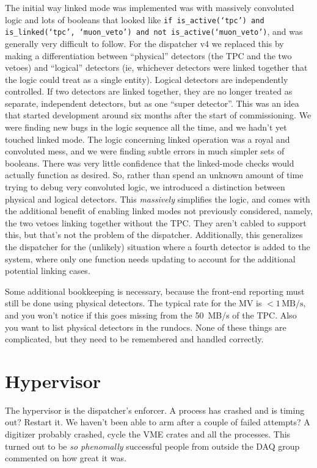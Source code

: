 The initial way linked mode was implemented was with massively convoluted logic and lots of booleans that looked like \texttt{if is\_active(`tpc') and is\_linked(`tpc', `muon\_veto') and not is\_active(`muon\_veto')}, and was generally very difficult to follow.
For the dispatcher v4 we replaced this by making a differentiation between ``physical'' detectors (the TPC and the two vetoes) and ``logical'' detectors (ie, whichever detectors were linked together that the logic could treat as a single entity).
Logical detectors are independently controlled.
If two detectors are linked together, they are no longer treated as separate, independent detectors, but as one ``super detector''.
This was an idea that started development around six months after the start of commissioning.
We were finding new bugs in the logic sequence all the time, and we hadn't yet touched linked mode.
The logic concerning linked operation was a royal and convoluted mess, and we were finding subtle errors in much simpler sets of booleans.
There was very little confidence that the linked-mode checks would actually function as desired.
So, rather than spend an unknown amount of time trying to debug very convoluted logic, we introduced a distinction between physical and logical detectors.
This \emph{massively} simplifies the logic, and comes with the additional benefit of enabling linked modes not previously considered, namely, the two vetoes linking together without the TPC.
They aren't cabled to support this, but that's not the problem of the dispatcher.
Additionally, this generalizes the dispatcher for the (unlikely) situation where a fourth detector is added to the system, where only one function needs updating to account for the additional potential linking cases.

Some additional bookkeeping is necessary, because the front-end reporting must still be done using physical detectors.
The typical rate for the MV is $<1\,\mathrm{MB/s}$, and you won't notice if this goes missing from the 50~MB/s of the TPC.
Also you want to list physical detectors in the rundocs.
None of these things are complicated, but they need to be remembered and handled correctly.

\section{Hypervisor}\label{sec:hypervisor}

The hypervisor is the dispatcher's enforcer.
A process has crashed and is timing out?
Restart it.
We haven't been able to arm after a couple of failed attempts?
A digitizer probably crashed, cycle the VME crates and all the processes.
This turned out to be \emph{so phenomally} successful people from outside the DAQ group commented on how great it was.

